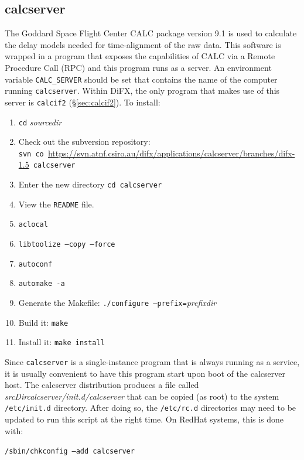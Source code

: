 
\subsection{calcserver} \label{sec:calcserver}

The Goddard Space Flight Center CALC package version 9.1 is used to calculate the delay models needed for time-alignment of the raw data.
This software is wrapped in a program that exposes the capabilities of CALC via a Remote Procedure Call (RPC) and this program runs as a server.
An environment variable {\tt CALC\_SERVER} should be set that contains the name of the computer running {\tt calcserver}.
Within DiFX, the only program that makes use of this server is {\tt calcif2} (\S\ref{sec:calcif2}).
To install:
\begin{enumerate}
\item {\tt cd} {\em sourcedir}
\item Check out the subversion repository: \\
{\tt svn co }\url{https://svn.atnf.csiro.au/difx/applications/calcserver/branches/difx-1.5}{\tt\ calcserver}
\item Enter the new directory {\tt cd calcserver}
\item View the {\tt README} file.
\item {\tt aclocal}
\item {\tt libtoolize --copy --force}
\item {\tt autoconf}
\item {\tt automake -a}
\item Generate the Makefile: {\tt ./configure --prefix=}{\em prefixdir}
\item Build it: {\tt make}
\item Install it: {\tt make install}
\end{enumerate}

Since {\tt calcserver} is a single-instance program that is always running as a service, it is usually convenient to have this program start upon boot of the calcserver host.
The calcserver distribution produces a file called {\em srcDir}{\em calcserver/init.d/calcserver} that can be copied (as root) to the system {\tt /etc/init.d} directory.
After doing so, the {\tt /etc/rc.d} directories may need to be updated to run this script at the right time.
On RedHat systems, this is done with:

\noindent
{\tt /sbin/chkconfig --add calcserver}








